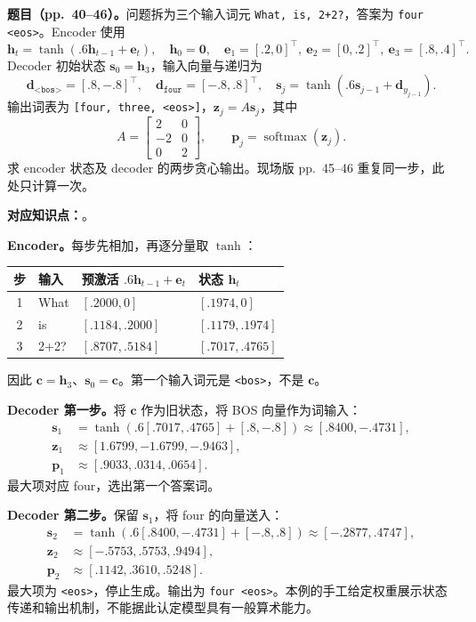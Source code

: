 \nopagebreak[4]
\textbf{题目（pp.~40--46）。}问题拆为三个输入词元 \texttt{What, is, 2+2?}，答案为 \texttt{four <eos>}。Encoder 使用
\[
 \mathbf h_t=\tanh(.6\mathbf h_{t-1}+\mathbf e_t),\quad\mathbf h_0=\mathbf0,
 \quad\mathbf e_1=[.2,0]^\top,\ \mathbf e_2=[0,.2]^\top,\ \mathbf e_3=[.8,.4]^\top.
\]
Decoder 初始状态 $\mathbf s_0=\mathbf h_3$，输入向量与递归为
\[
 \mathbf d_{\texttt{<bos>}}=[.8,-.8]^\top,\quad
 \mathbf d_{\texttt{four}}=[-.8,.8]^\top,\quad
 \mathbf s_j=\tanh(.6\mathbf s_{j-1}+\mathbf d_{y_{j-1}}).
\]
输出词表为 \texttt{[four, three, <eos>]}，$\mathbf z_j=A\mathbf s_j$，其中
\[
 A=\begin{bmatrix}2&0\\-2&0\\0&2\end{bmatrix},\qquad
 \mathbf p_j=\operatorname{softmax}(\mathbf z_j).
\]
求 encoder 状态及 decoder 的两步贪心输出。现场版 pp.~45--46 重复同一步，此处只计算一次。

\textbf{对应知识点：}。

\begin{workedsolution}
\textbf{Encoder。}每步先相加，再逐分量取 $\tanh$：
\begin{center}
\begin{tabular}{@{}c l l l@{}}
\toprule
步 & 输入 & 预激活 $.6\mathbf h_{t-1}+\mathbf e_t$ & 状态 $\mathbf h_t$ \\
\midrule
1 & What & $[.2000,0]$ & $[.1974,0]$ \\
2 & is & $[.1184,.2000]$ & $[.1179,.1974]$ \\
3 & 2+2? & $[.8707,.5184]$ & $[.7017,.4765]$ \\
\bottomrule
\end{tabular}
\end{center}
因此 $\mathbf c=\mathbf h_3$、$\mathbf s_0=\mathbf c$。第一个输入词元是 \texttt{<bos>}，不是 $\mathbf c$。

\textbf{Decoder 第一步。}将 $\mathbf c$ 作为旧状态，将 BOS 向量作为词输入：
\begin{align*}
 \mathbf s_1&=\tanh(.6[.7017,.4765]+[.8,-.8])
               \approx[.8400,-.4731],\\
 \mathbf z_1&\approx[1.6799,-1.6799,-.9463],\\
 \mathbf p_1&\approx[.9033,.0314,.0654].
\end{align*}
最大项对应 four，选出第一个答案词。

\textbf{Decoder 第二步。}保留 $\mathbf s_1$，将 four 的向量送入：
\begin{align*}
 \mathbf s_2&=\tanh(.6[.8400,-.4731]+[-.8,.8])
              \approx[-.2877,.4747],\\
 \mathbf z_2&\approx[-.5753,.5753,.9494],\\
 \mathbf p_2&\approx[.1142,.3610,.5248].
\end{align*}
最大项为 \texttt{<eos>}，停止生成。输出为 \texttt{four <eos>}。本例的手工给定权重展示状态传递和输出机制，不能据此认定模型具有一般算术能力。
\end{workedsolution}


